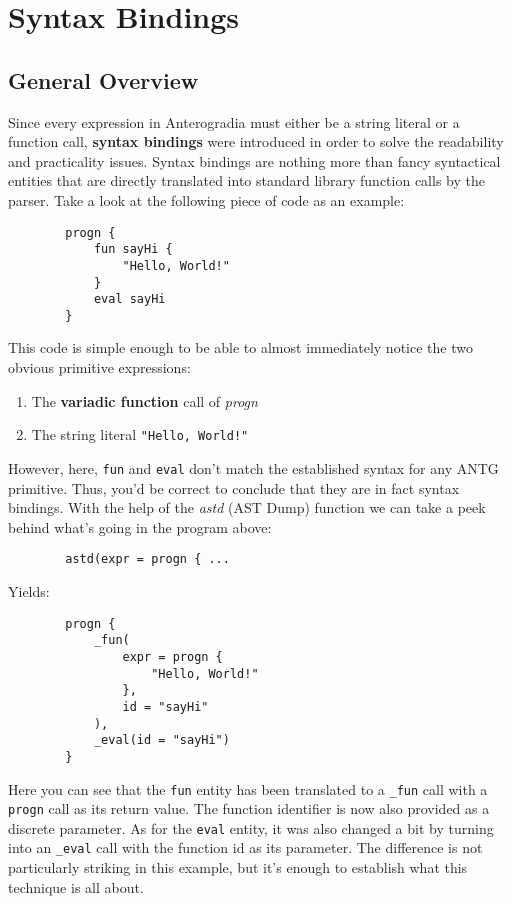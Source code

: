 \section{Syntax Bindings}

\subsection{General Overview}
\begin{multicols*}{2}
	Since every expression in Anterogradia must either be a string literal or a function call, \textbf{syntax bindings} were
	introduced in order to solve the readability and practicality issues.
	Syntax bindings are nothing more than fancy syntactical entities that are directly translated into standard library function
	calls by the parser.
	Take a look at the following piece of code as an example:
	\begin{verbatim}
		progn {
		    fun sayHi {
		        "Hello, World!"
		    }
		    eval sayHi
		}
	\end{verbatim}
	This code is simple enough to be able to almost immediately notice the two obvious primitive expressions:
	\begin{enumerate}
		\item The \textbf{variadic function} call of \textit{progn}
		\item The string literal \verb|"Hello, World!"|
	\end{enumerate}
	However, here, \verb|fun| and \verb|eval| don't match the established syntax for any ANTG primitive.
	Thus, you'd be correct to conclude that they are in fact syntax bindings.
	With the help of the \textit{astd} (AST Dump) function we can take a peek behind what's going in the program above:
	\begin{verbatim}
		astd(expr = progn { ...
	\end{verbatim}
	Yields:
	\begin{verbatim}
		progn {
		    _fun(
		        expr = progn {
		            "Hello, World!"
		        },
		        id = "sayHi"
		    ),
		    _eval(id = "sayHi")
		}
	\end{verbatim}
	Here you can see that the \verb|fun| entity has been translated to a \verb|_fun| call with a \verb|progn| call as its
	return value.
	The function identifier is now also provided as a discrete parameter.
	As for the \verb|eval| entity, it was also changed a bit by turning into an \verb|_eval| call with the function id
	as its parameter.
	The difference is not particularly striking in this example, but it's enough to establish what this technique is all about.

\end{multicols*}
